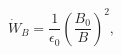\begin{equation}
\dot W_B = \frac{1}{\epsilon_{0}}\left(\frac{B_0}{B}\right)^2, \label{Bspeed}
\end{equation}

